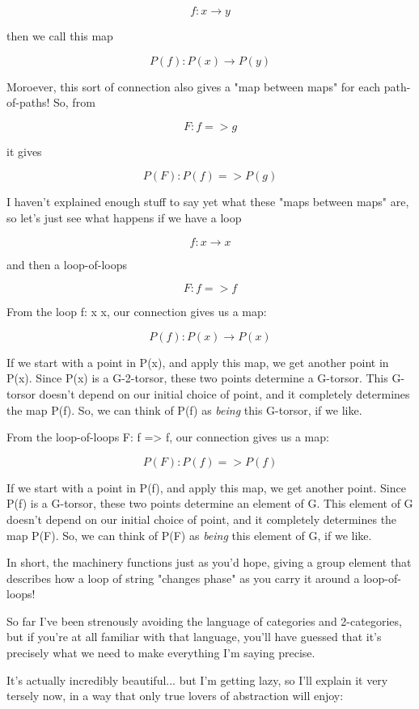 $$
f: x \to  y
$$
    
then we call this map

$$
P(f): P(x) \to  P(y)
$$
    

Moroever, this sort of connection also gives a "map between
maps" for each path-of-paths!  So, from

$$
F: f => g
$$
    
it gives

$$
P(F): P(f) => P(g)
$$
    
I haven't explained enough stuff to say yet what these "maps between
maps" are, so let's just see what happens if we have a loop 

$$
f: x \to  x
$$
    
and then a loop-of-loops 

$$
F: f => f
$$
    
From the loop f: x \to  x, our connection gives us a map:

$$
P(f): P(x) \to  P(x)
$$
    
If we start with a point in P(x), and apply this map, we get another 
point in P(x).  Since P(x) is a G-2-torsor, these two points determine a 
G-torsor.  This G-torsor doesn't depend on our initial choice of 
point, and it completely determines the map P(f).   So, we can think 
of P(f) as \emph{being} this G-torsor, if we like.

From the loop-of-loops F: f => f, our connection gives us a map:

$$
P(F): P(f) => P(f)
$$
    
If we start with a point in P(f), and apply this map, we get 
another point.  Since P(f) is a G-torsor, these two points determine an 
element of G.  This element of G doesn't depend on our initial choice 
of point, and it completely determines the map P(F).   So, 
we can think of P(F) as \emph{being} this element of G, if we like.

In short, the machinery functions just as you'd hope, giving a group
element that describes how a loop of string "changes phase"
as you carry it around a loop-of-loops!

So far I've been strenously avoiding the language of categories and 
2-categories, but if you're at all familiar with that language, you'll
have guessed that it's precisely what we need to make everything I'm 
saying precise.

It's actually incredibly beautiful... but I'm getting lazy, so I'll 
explain it very tersely now, in a way that only true lovers of abstraction 
will enjoy:


